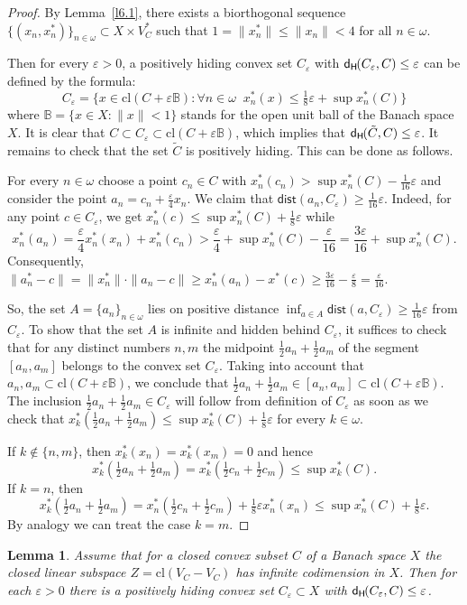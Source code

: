 \documentclass{amsart}
\newcommand{\IB}{\mathbb B}
\newcommand{\e}{\varepsilon}
\newcommand{\w}{\omega}
\newcommand{\dist}{\mathsf{dist}}
\newcommand{\cl}{\mathrm{cl}}
\newcommand{\dH}{\mathsf{d}_{\mathsf H}\kern-1pt}
\newtheorem{lemma}[theorem]{Lemma}
\theoremstyle{definition}
\begin{document}
\begin{proof} By Lemma~\ref{l6.1}, there exists a biorthogonal sequence $\{(x_n,x_n^*)\}_{n\in\w}\subset X\times V^*_C$ such that $1=\|x_n^*\|\le \|x_n\|<4$ for all $n\in\w$.

Then for every $\e>0$, a positively hiding convex set $C_\e$ with $\dH(C_\e,C)\le\e$ can be defined by the formula:
$$C_\e=\big\{x\in \cl(C+\e\IB):\forall n\in\w\;\;x^*_n(x)\le \tfrac18\e+\sup x^*_n(C)\big\}$$where $\IB=\{x\in X:\|x\|<1\}$ stands for the open unit ball of the Banach space $X$.
It is clear that $C\subset C_\e\subset \cl(C+\e\IB)$, which implies that $\dH(\tilde C,C)\le\e$.
It remains to check that the set $\tilde C$ is positively hiding. This can be done as follows.

For every $n\in\w$ choose a point $c_n\in C$ with $x^*_n(c_n)>\sup x^*_n(C)-\tfrac1{16}\e$ and consider the point $a_n=c_n+\frac{\e}4 x_n$. We claim that $\dist(a_n,C_\e)\ge \frac1{16}\e$. Indeed, for any point $c\in C_\e$, we get $x^*_n(c)\le\sup x^*_n(C)+\frac18\e$ while
$$x^*_n(a_n)=\frac\e4 x^*_n(x_n)+x^*_n(c_n)>\frac\e4+\sup x^*_n(C)-\frac\e{16}=\frac{3\e}{16}+\sup x^*_n(C).$$ Consequently, $\|a_n^*-c\|=\|x^*_n\|\cdot\|a_n-c\|\ge x^*_n(a_n)-x^*(c)\ge \frac{3\e}{16}-\frac{\e}{8}=\frac\e{16}$.

So, the set $A=\{a_n\}_{n\in\w}$ lies on positive distance $\inf_{a\in A}\dist(a,C_\e)\ge\frac1{16}\e$ from $C_\e$.
To show that the set $A$ is infinite and hidden behind $C_\e$, it suffices to check that for any distinct numbers $n,m$ the midpoint $\frac12a_n+\frac12a_m$ of the
segment $[a_n,a_m]$ belongs to the convex set $C_\e$.
Taking into account that $a_n,a_m\subset \cl(C+\e\IB)$, we conclude that $\frac12a_n+\frac12a_m\in [a_n,a_m]\subset \cl(C+\e\IB)$.
The inclusion $\frac12a_n+\frac12a_m\in C_\e$ will follow from definition of $C_\e$ as soon as we check that $x^*_k(\frac12a_n+\frac12a_m)\le\sup x^*_k(C)+\frac18\e$ for every $k\in\w$.

If $k\notin\{n,m\}$, then $x^*_k(x_n)=x^*_k(x_m)=0$ and hence
$$x^*_k(\tfrac12a_n+\tfrac12a_m)=x^*_k(\tfrac12c_n+\tfrac12c_m)\le\sup x^*_k(C).$$
If $k=n$, then
$$x^*_k(\tfrac12a_n+\tfrac12a_m)=x^*_n(\tfrac12c_n+\tfrac12c_m)+\tfrac18\e x^*_n(x_n)\le\sup x^*_n(C)+\tfrac18\e.$$By analogy we can treat the case $k=m$.
\end{proof}




\begin{lemma}\label{l6.3}  Assume that for a closed convex subset $C$ of a Banach space $X$ the closed linear subspace $Z=\cl(V_C-V_C)$  has infinite codimension in $X$. Then for each $\e>0$ there is a positively hiding convex set $C_\e\subset X$ with $\dH(C_\e,C)\le \e$.
\end{lemma}
\end{document}

